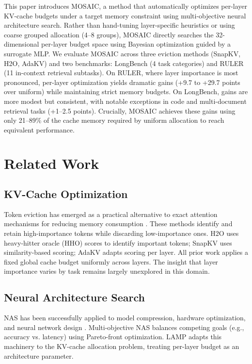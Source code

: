 \documentclass[11pt]{article}
\begin{document}
This paper introduces MOSAIC, a method that automatically optimizes per-layer KV-cache budgets under a target memory constraint using multi-objective neural architecture search. Rather than hand-tuning layer-specific heuristics or using coarse grouped allocation (4–8 groups), MOSAIC directly searches the 32-dimensional per-layer budget space using Bayesian optimization guided by a surrogate MLP. We evaluate MOSAIC across three eviction methods (SnapKV, H2O, AdaKV) and two benchmarks: LongBench (4 task categories) and RULER (11 in-context retrieval subtasks). On RULER, where layer importance is most pronounced, per-layer optimization yields dramatic gains (+9.7 to +29.7 points over uniform) while maintaining strict memory budgets. On LongBench, gains are more modest but consistent, with notable exceptions in code and multi-document retrieval tasks (+1–2.5 points). Crucially, MOSAIC achieves these gains using only 21–89\% of the cache memory required by uniform allocation to reach equivalent performance.

\section{Related Work}

\subsection{KV-Cache Optimization}

Token eviction has emerged as a practical alternative to exact attention mechanisms for reducing memory consumption \citep{zhang2024h2o,li2024snapkv,wei2024adakv}. These methods identify and retain high-importance tokens while discarding low-importance ones. H2O uses heavy-hitter oracle (HHO) scores to identify important tokens; SnapKV uses similarity-based scoring; AdaKV adapts scoring per layer. All prior work applies a fixed global cache budget uniformly across layers. The insight that layer importance varies by task remains largely unexplored in this domain.

\subsection{Neural Architecture Search}

NAS has been successfully applied to model compression, hardware optimization, and neural network design \citep{elsken2018neural}. Multi-objective NAS balances competing goals (e.g., accuracy vs. latency) using Pareto-front optimization. LAMP adapts this machinery to the KV-cache allocation problem, treating per-layer budget as an architecture parameter.
\end{document}
